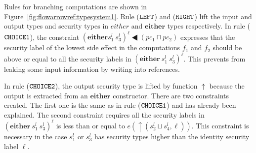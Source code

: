 \documentclass{report}
\newcommand{\co}[1]{$\cod{#1}$}
\newcommand{\sts}[1]{s_{#1}^l}
\newcommand{\sleql}{\LHD}
\newcommand{\tagup}{\uparrow}
\begin{document}
Rules for branching computations are shown in Figure~\ref{fig:flowarrowref:typesystem1}.
Rule (\co{LEFT}) and (\co{RIGHT}) lift the input and output
types and security types in $either$ and $\mathbf{either}$ types respectively. 
In rule (\co{CHOICE1}),  
the constraint $(\mathbf{either} \sts{1}\ \sts{3})^\ell\sleql (pc_1\sqcap pc_2)$
expresses that the security label of the lowest side effect in the computations $f_1$ and $f_2$ should be 
above or equal to all the security labels in $(\mathbf{either}~\sts{1}~\sts{3})^\ell$. 
This prevents from leaking some input information by writing into references.

In rule (\co{CHOICE2}), the output security type is lifted by function $\tagup$ because the
output is extracted from an $\mathbf{either}$ constructor. 
There are two constraints created. The first one is the same as
in rule (\co{CHOICE1}) and has already been explained. The second constraint 
requires all the security labels in $(\mathbf{either}\ \sts{1}\ \sts{3})^\ell$ is less than or
equal to $e(\tagup (\sts{2}\sqcup \sts{4},\ell))$.
This constraint is necessary in the case $\sts{1}$ or $\sts{3}$ has security types higher than
the identity security label $\ell$.
\end{document}
